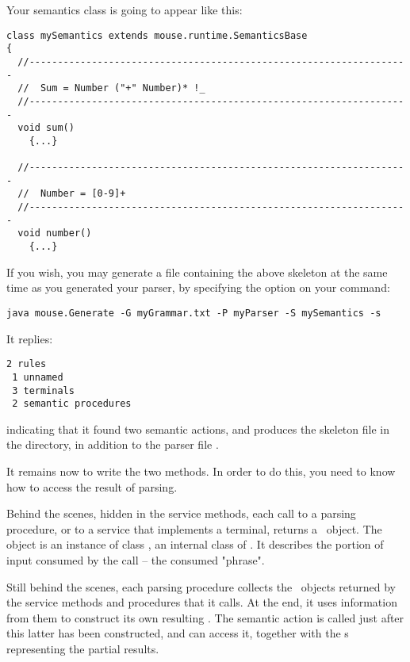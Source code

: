 Your semantics class is going to appear like this:

\small
\begin{Verbatim}[frame=single,framesep=2mm,samepage=true,xleftmargin=15mm,xrightmargin=15mm,baselinestretch=0.8]
class mySemantics extends mouse.runtime.SemanticsBase
{
  //-------------------------------------------------------------------
  //  Sum = Number ("+" Number)* !_
  //-------------------------------------------------------------------
  void sum()
    {...}
  
  //-------------------------------------------------------------------
  //  Number = [0-9]+
  //-------------------------------------------------------------------
  void number()
    {...}
\end{Verbatim}
\normalsize

If you wish, you may generate a file containing the above skeleton at the same time as you generated your parser,
by specifying the option  on your command:

\small
\begin{Verbatim}[samepage=true,xleftmargin=15mm,baselinestretch=0.8]
 java mouse.Generate -G myGrammar.txt -P myParser -S mySemantics -s
\end{Verbatim}
\normalsize

It replies:

\small
\begin{Verbatim}[samepage=true,xleftmargin=15mm,baselinestretch=0.8]
 2 rules
 1 unnamed
 3 terminals
 2 semantic procedures
\end{Verbatim}
\normalsize

indicating that it found two semantic actions,
and produces the skeleton file  in the  directory,
in addition to the parser file .

It remains now to write the two methods.
In order to do this, you need to know how to access the result of parsing. 

Behind the scenes, hidden in the service methods,
each call to a parsing procedure,
or to a service that implements a terminal,
returns a \Phrase\ object. 
The object is an instance of class \Phrase,
an internal class of .
It describes the portion of input consumed
by the call -- the consumed "phrase".

Still behind the scenes, each parsing procedure collects 
the \Phrase\ objects returned
by the service methods and procedures that it calls.
At the end, it uses information from them
to construct its own resulting \Phrase.
The semantic action is called just after this latter
has been constructed, and can access it, together
with the \Phrase s representing the partial results.

